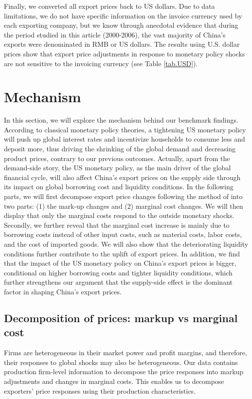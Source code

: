 Finally, we converted all export prices back to US dollars. Due to data limitations, we do not have specific information on the invoice currency used by each exporting company, but we know through anecdotal evidence that during the period studied in this article (2000-2006), the vast majority of China's exports were denominated in RMB or US dollars. The results using U.S. dollar prices show that export price adjustments in response to monetary policy shocks are not sensitive to the invoicing currency (see Table \ref{tab.USD}).


\section{Mechanism}

In this section, we will explore the mechanism behind our benchmark findings. According to classical monetary policy theories, a tightening US monetary policy will push up global interest rates and incentivize households to consume less and deposit more, thus driving the shrinking of the global demand and decreasing product prices, contrary to our previous outcomes. Actually, apart from the demand-side story, the US monetary policy, as the main driver of the global financial cycle, will also affect China's export prices on the supply side through its impact on global borrowing cost and liquidity conditions. In the following parts, we will first decompose export price changes following the method of \cite{deloecker2012markups}into two parts: (1) the mark-up changes and (2) marginal cost changes. We will then display that only the marginal costs respond to the outside monetary shocks. Secondly, we further reveal that the marginal cost increase is mainly due to borrowing costs instead of other input costs, such as material costs, labor costs, and the cost of imported goods. We will also show that the deteriorating liquidity conditions further contribute to the uplift of export prices. In addition, we find that the impact of the US monetary policy on China's export prices is bigger, conditional on higher borrowing costs and tighter liquidity conditions, which further strengthens our argument that the supply-side effect is the dominant factor in shaping China's export prices.

\subsection{Decomposition of prices: markup vs marginal cost}

Firms are heterogeneous in their market power and profit margins, and therefore, their responses to global shocks may also be heterogeneous. Our data contains production firm-level information to decompose the price responses into markup adjustments and changes in marginal costs. This enables us to decompose exporters' price responses using their production characteristics.

